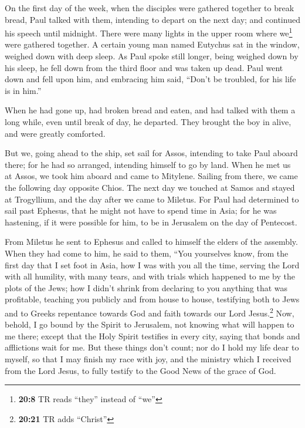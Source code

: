  On the first day of the week, when the disciples were
gathered together to break bread, Paul talked with them, intending to
depart on the next day; and continued his speech until midnight.
 There were many lights in the upper room where
we\footnote{\textbf{20:8} TR reads ``they'' instead of ``we''} were
gathered together.  A certain young man named Eutychus sat
in the window, weighed down with deep sleep. As Paul spoke still longer,
being weighed down by his sleep, he fell down from the third floor and
was taken up dead.  Paul went down and fell upon him, and
embracing him said, ``Don't be troubled, for his life is in him.''

 When he had gone up, had broken bread and eaten, and had
talked with them a long while, even until break of day, he departed.
 They brought the boy in alive, and were greatly
comforted.

 But we, going ahead to the ship, set sail for Assos,
intending to take Paul aboard there; for he had so arranged, intending
himself to go by land.  When he met us at Assos, we took
him aboard and came to Mitylene.  Sailing from there, we
came the following day opposite Chios. The next day we touched at Samos
and stayed at Trogyllium, and the day after we came to Miletus.
 For Paul had determined to sail past Ephesus, that he
might not have to spend time in Asia; for he was hastening, if it were
possible for him, to be in Jerusalem on the day of Pentecost.

 From Miletus he sent to Ephesus and called to himself
the elders of the assembly.  When they had come to him,
he said to them, ``You yourselves know, from the first day that I set
foot in Asia, how I was with you all the time,  serving
the Lord with all humility, with many tears, and with trials which
happened to me by the plots of the Jews;  how I didn't
shrink from declaring to you anything that was profitable, teaching you
publicly and from house to house,  testifying both to
Jews and to Greeks repentance towards God and faith towards our Lord
Jesus.\footnote{\textbf{20:21} TR adds ``Christ''}  Now,
behold, I go bound by the Spirit to Jerusalem, not knowing what will
happen to me there;  except that the Holy Spirit
testifies in every city, saying that bonds and afflictions wait for me.
 But these things don't count; nor do I hold my life dear
to myself, so that I may finish my race with joy, and the ministry which
I received from the Lord Jesus, to fully testify to the Good News of the
grace of God.

